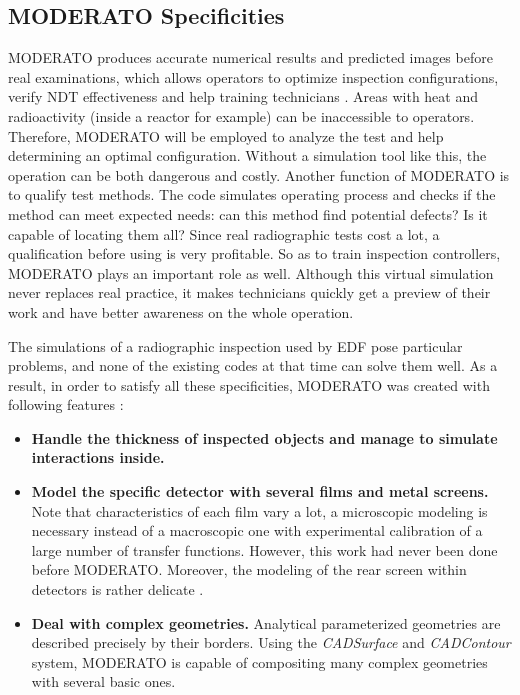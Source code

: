
\subsection{MODERATO Specificities}
MODERATO produces accurate numerical results and predicted images before real examinations, which allows operators to optimize inspection configurations, verify NDT effectiveness and help training technicians \citep{Reference10}. Areas with heat and radioactivity (inside a reactor for example) can be inaccessible to operators. Therefore, MODERATO will be employed to analyze the test and help determining an optimal configuration. Without a simulation tool like this, the operation can be both dangerous and costly. Another function of MODERATO is to qualify test methods. The code simulates operating process and checks if the method can meet expected needs: can this method find potential defects? Is it capable of locating them all? Since real radiographic tests cost a lot, a qualification before using is very profitable. So as to train inspection controllers, MODERATO plays an important role as well. Although this virtual simulation never replaces real practice, it makes technicians quickly get a preview of their work and have better awareness on the whole operation.

The simulations of a radiographic inspection used by EDF pose particular problems, and none of the existing codes at that time can solve them well. As a result, in order to satisfy all these specificities, MODERATO was created with following features \citep{Reference10}:
\begin{itemize}
  \it
  \item \textbf{Handle the thickness of inspected objects and manage to simulate interactions inside.} 
  \item \textbf{Model the specific detector with several films and metal screens.} Note that characteristics of each film vary a lot, a microscopic modeling is necessary instead of a macroscopic one with experimental calibration of a large number of transfer functions. However, this work had never been done before MODERATO. Moreover, the modeling of the rear screen within detectors is rather delicate \citep{Reference10}.
  \item \textbf{Deal with complex geometries.} Analytical parameterized geometries are described precisely by their borders. Using the \textit{CADSurface} and \textit{CADContour} system, MODERATO is capable of compositing many complex geometries with several basic ones.
\end{itemize}

